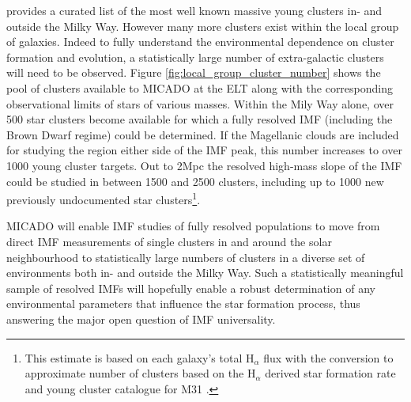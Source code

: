 \citet{portegies2010} provides a curated list of the most well known massive young clusters in- and outside the Milky Way. However many more clusters exist within the local group of galaxies. 
Indeed to fully understand the environmental dependence on cluster formation and evolution, a statistically large number of extra-galactic clusters will need to be observed. 
Figure \ref{fig:local_group_cluster_number} shows the pool of clusters available to MICADO at the ELT along with the corresponding observational limits of stars of various masses. 
Within the Mily Way alone, over 500 star clusters become available for which a fully resolved IMF (including the Brown Dwarf regime) could be determined. 
If the Magellanic clouds are included for studying the region either side of the IMF peak, this number increases to over 1000 young cluster targets. 
Out to 2Mpc the resolved high-mass slope of the IMF could be studied in between 1500 and 2500 clusters, including up to 1000 new previously undocumented star clusters\footnote{This estimate is based on each galaxy's total H$_\alpha$ flux with the conversion to approximate number of clusters based on the H$_\alpha$ derived star formation rate and young cluster catalogue for M31 \citep{caldwell09}.}.

MICADO will enable IMF studies of fully resolved populations to move from direct IMF measurements of single clusters in and around the solar neighbourhood to statistically large numbers of clusters in a diverse set of environments both in- and outside the Milky Way. Such a statistically meaningful sample of resolved IMFs will hopefully enable a robust determination of any environmental parameters that influence the star formation process, thus answering the major open question of IMF universality.

% 



